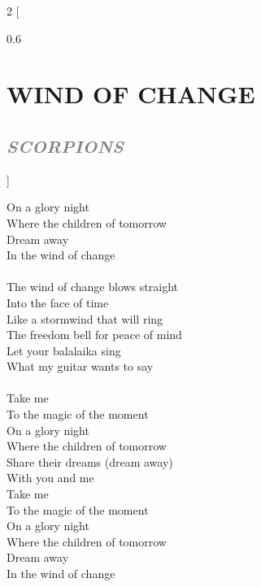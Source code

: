 \documentclass[100pt,a4paper]{report}
\newenvironment{song2}[2]
	{	
    	\begin{multicols*}{2}
		[
			\begin{spacing}{0.6}
				\section*{\LARGE\centering \MakeUppercase{\textbf{{#1}}}}
				\subsection*{\Large\centering \textit{\textcolor{gray}{\MakeUppercase{{#2}}}}}
			\end{spacing}
		]
		\Large
	}
	{
	\end{multicols*}
	\newpage
    }
\begin{document}
\begin{song2}{Wind of change}{Scorpions}
On a glory night\\
Where the children of tomorrow\\
Dream away\\
In the wind of change\\
\\
The wind of change blows straight\\ 
Into the face of time\\
Like a stormwind that will ring\\
The freedom bell for peace of mind\\
Let your balalaika sing\\
What my guitar wants to say\\
\\
Take me\\ 
To the magic of the moment\\
On a glory night\\
Where the children of tomorrow\\ 
Share their dreams (dream away)\\
With you and me\\
Take me\\
To the magic of the moment\\
On a glory night\\
Where the children of tomorrow\\
Dream away\\
In the wind of change\\
\end{song2}
\end{document}
